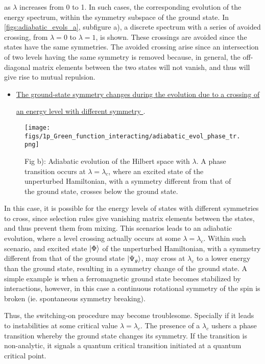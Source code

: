     as $\lambda$ increases from 0 to 1. In such cases, the corresponding evolution of the energy spectrum, within the symmetry subspace of the ground state. In \cref{figs:adiabatic_evols_a}, subfigure a), a discrete spectrum with a series of avoided crossing, from $\lambda = 0$ to $\lambda = 1$, is shown. These crossings are avoided since the states have the same symmetries. The avoided crossing arise since an intersection of two levels having the same symmetry is removed because, in general, the off-diagonal matrix elements between the two states will not vanish, and thus will give rise to mutual repulsion. \clearpage

\begin{itemize}
    \item \underline{The ground-state symmetry changes during the evolution due to a crossing of} 
    
    \underline{ an energy level with different symmetry }.
\end{itemize}

    \begin{wrapfigure}{l}{0.3\textwidth}
        \texttt{[image: figs/1p\_Green\_function\_interacting/adiabatic\_evol\_phase\_tr.png]}
        \caption{\small Fig b): Adiabatic evolution of the Hilbert space with $\lambda$. A phase transition occurs at $\lambda = \lambda_c$, where an excited state of the unperturbed Hamiltonian, with a symmetry different from that of the ground state, crosses below the ground state. }
        \label{figs:adiabatic_evols_b}
    \end{wrapfigure} 
    
    In this case, it is possible for the energy levels of states with different symmetries to cross, since selection rules give vanishing matrix elements between the states, and thus prevent them from mixing. This scenarios leads to an adiabatic evolution, where a level crossing actually occurs at some $\lambda = \lambda_c$. Within such scenario, and excited state $\ket{\Phi}$ of the unperturbed Hamiltonian, with a symmetry different from that of the ground state $\ket{\Psi_g}$, may cross at $\lambda_c$ to a lower energy than the ground state, resulting in a symmetry change of the ground state. A simple example is when a ferromagnetic ground state becomes stabilized by interactions, however, in this case a continuous rotational symmetry of the spin is broken (ie. spontaneous symmetry breaking).  \bigbreak

Thus, the switching-on procedure may become troublesome. Specially if it leads to instabilities at some critical value $\lambda = \lambda_c$. The presence of a $\lambda_c$ ushers a phase transition whereby the ground state changes its symmetry. If the transition is non-analytic, it signals a quantum critical transition initiated at a quantum critical point. \\

